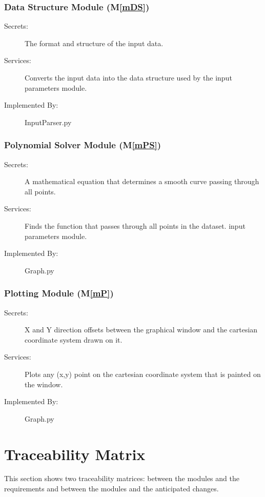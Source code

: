 \documentclass[12pt, titlepage]{article}
\newcommand{\mref}[1]{M\ref{#1}}
\begin{document}
\subsubsection{Data Structure Module (\mref{mDS})}
\begin{description}
\item[Secrets:]The format and structure of the input data.
\item[Services:]Converts the input data into the data structure used by the
  input parameters module.
\item[Implemented By:] InputParser.py
\end{description}

\subsubsection{Polynomial Solver Module (\mref{mPS})}
\begin{description}
\item[Secrets:]A mathematical equation that determines a smooth curve passing through all points.
\item[Services:]Finds the function that passes through all points in the dataset. 
  input parameters module.
\item[Implemented By:] Graph.py
\end{description}

\subsubsection{Plotting Module (\mref{mP})}
\begin{description}
\item[Secrets:] X and Y direction offsets between the graphical window and the cartesian coordinate system drawn on it.
\item[Services:]Plots any (x,y) point on the cartesian coordinate system that is painted on the window. 
\item[Implemented By:] Graph.py
\end{description}

\section{Traceability Matrix} \label{SecTM}%

This section shows two traceability matrices: between the modules and the
requirements and between the modules and the anticipated changes.
\end{document}
